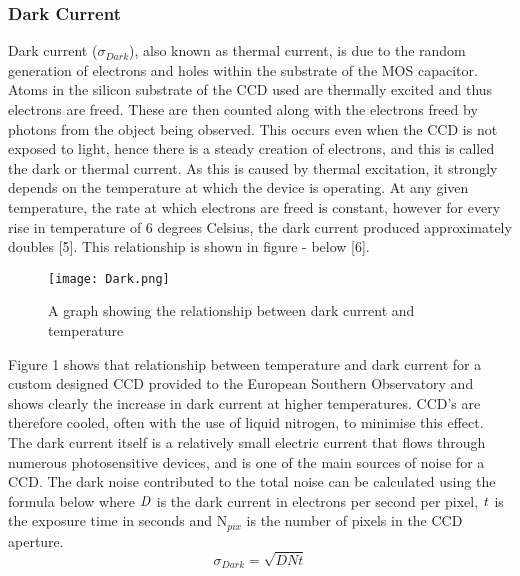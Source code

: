 \documentclass[pdf,color]{UoBnote}
\begin{document}
\subsubsection{Dark Current}
Dark current ($\sigma$$_{Dark}$), also known as thermal current, is due to the random generation of electrons and holes within the substrate of the MOS capacitor. Atoms in the silicon substrate of the CCD used are thermally excited and thus electrons are freed. These are then counted along with the electrons freed by photons from the object being observed. This occurs even when the CCD is not exposed to light, hence there is a steady creation of electrons, and this is called the dark or thermal current. As this is caused by thermal excitation, it strongly depends on the temperature at which the device is operating. At any given temperature, the rate at which electrons are freed is constant, however for every rise in temperature of 6 degrees Celsius, the dark current produced approximately doubles [5]. This relationship is shown in figure - below [6].

\begin{figure}[H]
\begin{center}
\texttt{[image: Dark.png]}
\end{center}
\caption{A graph showing the relationship between dark current and temperature}\label{fig:figure1}
\end{figure}
\noindent
Figure 1 shows that relationship between temperature and dark current for a custom designed CCD provided to the European Southern Observatory and shows clearly the increase in dark current at higher temperatures. CCD’s are therefore cooled, often with the use of liquid nitrogen, to minimise this effect. The dark current itself is a relatively small electric current that flows through numerous photosensitive devices, and is one of the main sources of noise for a CCD. The dark noise contributed to the total noise can be calculated using the formula below where $\it{D}$ is the dark current in electrons per second per pixel, $\it{t}$ is the exposure time in seconds and N$_{pix}$ is the number of pixels in the CCD aperture.\\
\begin{equation}
\sigma_{Dark} = \sqrt{DNt}
\end{equation}
\end{document}
